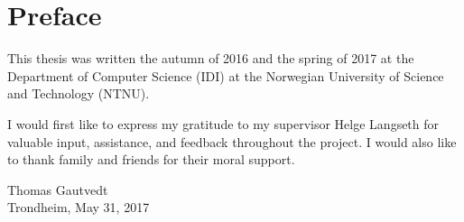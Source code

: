 
\chapter*{Preface}
This thesis was written the autumn of 2016 and the spring of 2017 at the Department of Computer Science (IDI) at the Norwegian University of Science and Technology (NTNU). \newline

\noindent I would first like to express my gratitude to my supervisor Helge Langseth for valuable input, assistance, and feedback throughout the project. I would also like to thank family and friends for their moral support. \newline

\begin{flushright}
Thomas Gautvedt \\
Trondheim, May 31, 2017
\end{flushright}